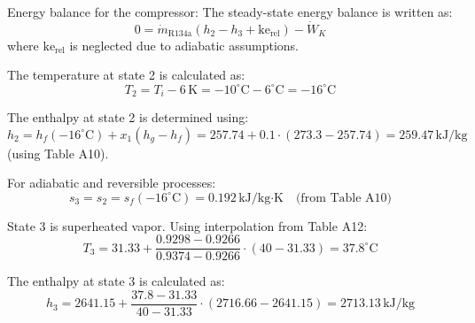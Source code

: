 Energy balance for the compressor:  
The steady-state energy balance is written as:  
\[
0 = \dot{m}_{\text{R134a}} \left( h_2 - h_3 + \text{ke}_{\text{rel}} \right) - \dot{W}_K
\]  
where \( \text{ke}_{\text{rel}} \) is neglected due to adiabatic assumptions.  

The temperature at state 2 is calculated as:  
\[
T_2 = T_i - 6 \, \text{K} = -10^\circ\text{C} - 6^\circ\text{C} = -16^\circ\text{C}
\]  

The enthalpy at state 2 is determined using:  
\[
h_2 = h_f(-16^\circ\text{C}) + x_1 \left( h_g - h_f \right) = 257.74 + 0.1 \cdot (273.3 - 257.74) = 259.47 \, \text{kJ/kg}
\]  
(using Table A10).  

For adiabatic and reversible processes:  
\[
s_3 = s_2 = s_f(-16^\circ\text{C}) = 0.192 \, \text{kJ/kg·K} \quad \text{(from Table A10)}  
\]  

State 3 is superheated vapor. Using interpolation from Table A12:  
\[
T_3 = 31.33 + \frac{0.9298 - 0.9266}{0.9374 - 0.9266} \cdot (40 - 31.33) = 37.8^\circ\text{C}
\]  

The enthalpy at state 3 is calculated as:  
\[
h_3 = 2641.15 + \frac{37.8 - 31.33}{40 - 31.33} \cdot (2716.66 - 2641.15) = 2713.13 \, \text{kJ/kg}
\]